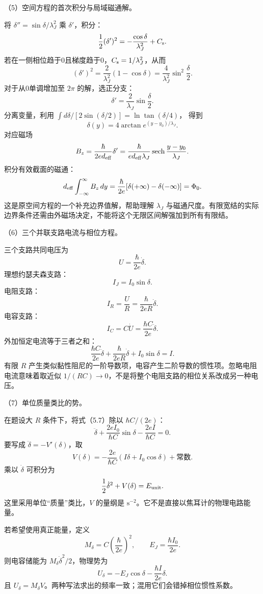 \documentclass[12pt,a4paper,fontset=fandol]{ctexart}
\begin{document}
（5）空间方程的首次积分与局域磁通解。

将 \(\delta''=\sin\delta/\lambda_J^2\) 乘 \(\delta'\)，积分： \[
\frac12(\delta')^2=-\frac{\cos\delta}{\lambda_J^2}+C_{\rm s}.
\] 若在一侧相位趋于0且梯度趋于0，\(C_{\rm s}=1/\lambda_J^2\)，从而 \[
(\delta')^2=\frac{2}{\lambda_J^2}(1-\cos\delta)
=\frac4{\lambda_J^2}\sin^2\frac\delta2.
\] 对于从0单调增加至 \(2\pi\) 的解，选正分支： \[
\delta'=\frac2{\lambda_J}\sin\frac\delta2.
\] 分离变量，利用 \(\int d\delta/[2\sin(\delta/2)]=\ln\tan(\delta/4)\)，
得到 \[
\delta(y)=4\arctan e^{(y-y_0)/\lambda_J}.
\] 对应磁场 \[
B_z=\frac{\hbar}{2ed_{\rm eff}}\delta'
=\frac{\hbar}{ed_{\rm eff}\lambda_J}
\operatorname{sech}\frac{y-y_0}{\lambda_J}.
\] 积分有效截面的磁通： \[
d_{\rm eff}\int_{-\infty}^{\infty}B_z\,dy
=\frac{\hbar}{2e}[\delta(+\infty)-\delta(-\infty)]
=\Phi_0.
\] 这是原空间方程的一个补充边界值解，帮助理解 \(\lambda_J\)
与磁通尺度。有限宽结的实际边界条件还需由外磁场决定，不能将这个无限区间解强加到所有有限结。

（6）三个并联支路电流与相位方程。

三个支路共同电压为 \[
U=\frac{\hbar}{2e}\dot\delta.
\] 理想约瑟夫森支路： \[
I_J=I_0\sin\delta.
\] 电阻支路： \[
I_R=\frac UR=\frac{\hbar}{2eR}\dot\delta.
\] 电容支路： \[
I_C=C\dot U=\frac{\hbar C}{2e}\ddot\delta.
\] 外加恒定电流等于三者之和： \[
\boxed{
\frac{\hbar C}{2e}\ddot\delta
+\frac{\hbar}{2eR}\dot\delta
+I_0\sin\delta=I.}\tag{5.7}
\] 有限 \(R\)
产生类似黏性阻尼的一阶导数项，电容产生二阶导数的惯性项。忽略电阻电流意味着取近似
\(1/(RC)\to0\)，不是将整个电阻支路的相位关系改成另一种电压。

（7）单位质量类比的势。

在题设大 \(R\) 条件下，将式（5.7）除以 \(\hbar C/(2e)\)： \[
\ddot\delta+\frac{2eI_0}{\hbar C}\sin\delta
-\frac{2eI}{\hbar C}=0.
\] 要写成 \(\ddot\delta=-V'(\delta)\)，取 \[
\boxed{V(\delta)=
-\frac{2e}{\hbar C}(I\delta+I_0\cos\delta)+\text{常数}.}\tag{5.8}
\] 乘以 \(\dot\delta\) 可积分为 \[
\frac12\dot\delta^2+V(\delta)=E_{\rm unit}.
\] 这里采用单位``质量''类比，\(V\) 的量纲是
\(\mathrm{s^{-2}}\)。它不是直接以焦耳计的物理电路能量。

若希望使用真正能量，定义 \[
M_\delta=C\left(\frac{\hbar}{2e}\right)^2,\qquad
E_J=\frac{\hbar I_0}{2e}.
\] 则电容储能为 \(M_\delta\dot\delta^2/2\)，物理势为 \[
U_\delta=-E_J\cos\delta-\frac{\hbar I}{2e}\delta.
\] 且
\(U_\delta=M_\delta V\)。两种写法求出的频率一致；混用它们会错掉相位惯性系数。
\end{document}
